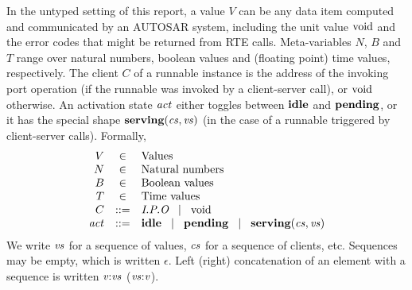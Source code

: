 \documentclass[twocolumn]{article}
\begin{document}
In the untyped setting of this report, a value $V$ can be any data item computed and communicated by an AUTOSAR system, including the unit value $\text{void}$ and the error codes that might be returned from RTE calls. Meta-variables $N$, $B$ and $T$ range over natural numbers, boolean values and (floating point) time values, respectively. The client $C$ of a runnable instance is the address of the invoking port operation (if the runnable was invoked by a client-server call), or $\text{void}$ otherwise. An activation state $\Act$ either toggles between $\textbf{idle}$ and $\textbf{pending}$, or it has the special shape $\Tserving{\Cs}{\Vs}$ (in the case of a runnable triggered by client-server calls). Formally,
\[
\begin{array}{rcll}
  V    & \in & \text{Values} \\
  N    & \in & \text{Natural numbers} \\
  B    & \in & \text{Boolean values} \\
  T    & \in & \text{Time values} \\
  C    & ::= & \Top{O}{P}{I} \sep \Tvoid \\
  \Act & ::= & \Tidle \sep \Tpending \sep \Tserving{\Cs}{\Vs} \\
\end{array}
\]
We write $\Vs$ for a sequence of values, $\Cs$ for a sequence of clients, etc. Sequences may be empty, which is written $\epsilon$. Left (right) concatenation of an element with a sequence is written $\Tcons{\V{V}}{\V{Vs}}$ ($\Tsnoc{\V{Vs}}{\V{V}}$).
\end{document}
